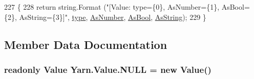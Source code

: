 \begin{DoxyCode}
227         \{
228             \textcolor{keywordflow}{return} string.Format (\textcolor{stringliteral}{"[Value: type=\{0\}, AsNumber=\{1\}, AsBool=\{2\}, AsString=\{3\}]"}, 
      \hyperlink{a00163_a6d5820fafa766911b9da84d1ed33e51a}{type}, \hyperlink{a00163_a751419743761562bf902246d6e6a3c0a}{AsNumber}, \hyperlink{a00163_a5805faef3b3d376090ff096d6dd6c064}{AsBool}, \hyperlink{a00163_a2d5d0ec41c50c642c1d0eeeb6bb2b1c0}{AsString});
229         \}
\end{DoxyCode}


\subsection{Member Data Documentation}
\hypertarget{a00163_a1ed2964965baca8621c45efa23f37660}{
\subsubsection[{N\-U\-L\-L}]{\setlength{\rightskip}{0pt plus 5cm}readonly {\bf Value} Yarn.\-Value.\-N\-U\-L\-L = new {\bf Value}()\hspace{0.3cm}{\ttfamily [static]}}}\label{a00163_a1ed2964965baca8621c45efa23f37660}


